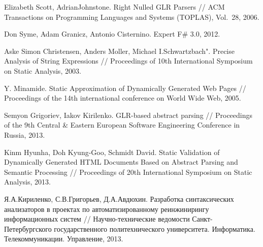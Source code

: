 \begin{thebibliography}{99}
Elizabeth Scott, AdrianJohnstone.
Right Nulled GLR Parsers //
ACM Transactions on Programming Languages and Systems (TOPLAS), Vol.~28, 2006.

Don Syme, Adam Granicz, Antonio Cisternino.
Expert F\# 3.0, 2012.

Aske Simon Christensen, Anders Moller, Michael I.Schwartzbach".
Precise Analysis of String Expressions //
Proceedings of 10th International Symposium on Static Analysis, 2003.

Y. Minamide. Static Approximation of Dynamically Generated Web Pages //
Proceedings of the 14th international conference on World Wide Web, 2005.

Semyon Grigoriev, Iakov Kirilenko. GLR-based abstract parsing //
Proceedings of the 9th Central \& Eastern European Software Engineering Conference in Russia, 2013.

Kinm Hyunha, Doh Kyung-Goo, Schmidt David.
Static Validation of Dynamically Generated HTML Documents Based on Abstract Parsing and Semantic Processing //
Proceedings of 20th International Symposium on Static Analysis, 2013.

Я.А.Кириленко, С.В.Григорьев, Д.А.Авдюхин.
Разработка синтаксических анализаторов в проектах по автоматизированному реинжинирингу информационных систем //
Научно-технические ведомости Санкт-Петербургского государственного политехнического университета. Информатика. Телекоммуникации. Управление, 2013.
\end{thebibliography}
